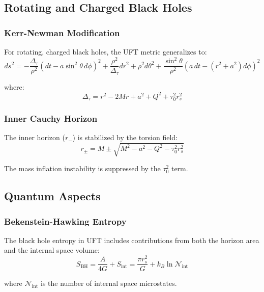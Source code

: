 \subsection{Rotating and Charged Black Holes}

\subsubsection{Kerr-Newman Modification}

For rotating, charged black holes, the UFT metric generalizes to:
\begin{equation}
    ds^2 = -\frac{\Delta_\tau}{\rho^2}\left(dt - a\sin^2\theta \, d\phi\right)^2 + \frac{\rho^2}{\Delta_\tau}dr^2 + \rho^2 d\theta^2 + \frac{\sin^2\theta}{\rho^2}\left(a \, dt - (r^2+a^2)d\phi\right)^2
\end{equation}

where:
\begin{equation}
    \Delta_\tau = r^2 - 2Mr + a^2 + Q^2 + \tau_0^2 r_s^2
\end{equation}

\subsubsection{Inner Cauchy Horizon}

The inner horizon ($r_-$) is stabilized by the torsion field:
\begin{equation}
    r_{\pm} = M \pm \sqrt{M^2 - a^2 - Q^2 - \tau_0^2 r_s^2}
\end{equation}

The mass inflation instability is suppressed by the $\tau_0^2$ term.

\subsection{Quantum Aspects}

\subsubsection{Bekenstein-Hawking Entropy}

The black hole entropy in UFT includes contributions from both the horizon area and the internal space volume:
\begin{equation}
    S_{\text{BH}} = \frac{A}{4G} + S_{\text{int}} = \frac{\pi r_s^2}{G} + k_B \ln \mathcal{N}_{\text{int}}
\end{equation}

where $\mathcal{N}_{\text{int}}$ is the number of internal space microstates.

